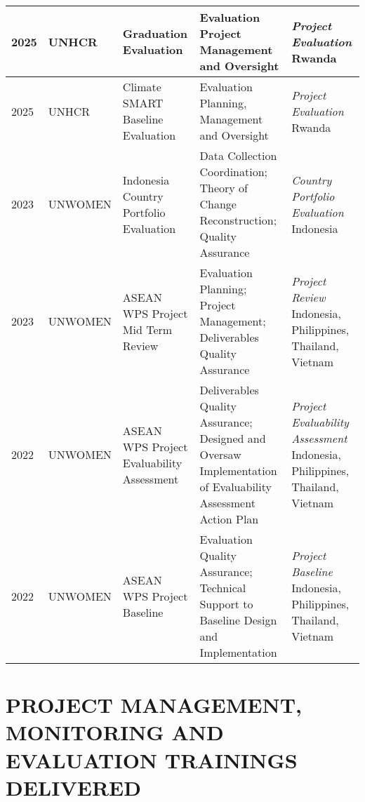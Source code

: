 \documentclass[
  10pt,
]{article}
\begin{document}
\begin{landscape}
\begin{tabularx}{\linewidth}{|l|l|X|X|X|}
\hline
2025 & UNHCR & Graduation Evaluation & Evaluation Project Management and Oversight & \emph{Project Evaluation} Rwanda \\
\hline
2025 & UNHCR & Climate SMART Baseline Evaluation & Evaluation Planning, Management and Oversight & \emph{Project Evaluation} Rwanda \\
\hline
2023 & UNWOMEN & Indonesia Country Portfolio Evaluation & Data Collection Coordination; Theory of Change Reconstruction; Quality Assurance & \emph{Country Portfolio Evaluation} Indonesia \\
\hline
2023 & UNWOMEN & ASEAN WPS Project Mid Term Review & Evaluation Planning; Project Management; Deliverables Quality Assurance & \emph{Project Review} Indonesia, Philippines, Thailand, Vietnam \\
\hline
2022 & UNWOMEN & ASEAN WPS Project Evaluability Assessment & Deliverables Quality Assurance; Designed and Oversaw Implementation of Evaluability Assessment Action Plan & \emph{Project Evaluability Assessment} Indonesia, Philippines, Thailand, Vietnam \\
\hline
2022 & UNWOMEN & ASEAN WPS Project Baseline & Evaluation Quality Assurance; Technical Support to Baseline Design and Implementation & \emph{Project Baseline} Indonesia, Philippines, Thailand, Vietnam \\
\hline
\end{tabularx}


\section{PROJECT MANAGEMENT, MONITORING AND EVALUATION TRAININGS DELIVERED}


\end{landscape}
\end{document}
